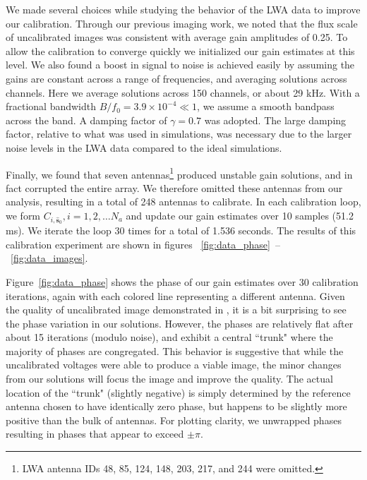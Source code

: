 \documentclass[a4paper,fleqn,usenatbib]{mnras}
\begin{document}
We made several choices while studying the behavior of the LWA data to improve our 
calibration. Through our previous imaging work, we noted that the flux scale of uncalibrated 
images was consistent with average gain amplitudes of 0.25. To allow the calibration to 
converge quickly we initialized our gain estimates at this level. 
We also found a boost in signal to noise is achieved easily by assuming the gains are
constant across a range of frequencies, and averaging solutions across channels.
Here we average solutions across 150 channels, or about 29 kHz. 
With a fractional bandwidth $B/f_0 = 3.9 \times 10^{-4} \ll 1$, we assume a smooth bandpass 
across the band. 
A damping factor of $\gamma = 0.7$ was adopted.
The large damping factor, relative to what was used in simulations, was necessary due to
the larger noise levels in the LWA data compared to the ideal simulations.

Finally, we found that seven antennas\footnote{LWA antenna IDs 48, 85, 124, 148, 203, 217, 
and 244 were omitted.} produced unstable gain solutions, and in fact corrupted the entire array. 
We therefore omitted these antennas from our analysis, resulting in a total of 248 antennas to 
calibrate. In each calibration loop, we form $C_{i,\hat{\boldsymbol{s}}_0}, i=1,2,\ldots N_a$ and 
update our gain estimates over 10 samples (51.2 ms). We iterate the loop 30 times for a 
total of 1.536 seconds. The results of this calibration experiment are shown in figures~
\ref{fig:data_phase}~--~\ref{fig:data_images}.

Figure~\ref{fig:data_phase} shows the phase of our gain estimates over 30 calibration 
iterations, again with each colored line representing a different antenna. Given the quality of 
uncalibrated image demonstrated in \cite{thy15c}, it is a bit surprising to see the phase 
variation in our solutions. However, the phases are relatively flat after about 15 iterations 
(modulo noise), and exhibit a central ``trunk" where the majority of phases are congregated. 
This behavior is suggestive that while the uncalibrated voltages were able to produce a viable 
image, the minor changes from our solutions will focus the image and improve the quality. The 
actual location of the ``trunk" (slightly negative) is simply determined by the reference antenna 
chosen to have identically zero phase, but happens to be slightly more positive than the bulk of 
antennas. For plotting clarity, we unwrapped phases resulting in phases that appear to exceed 
$\pm \pi$.
\end{document}
